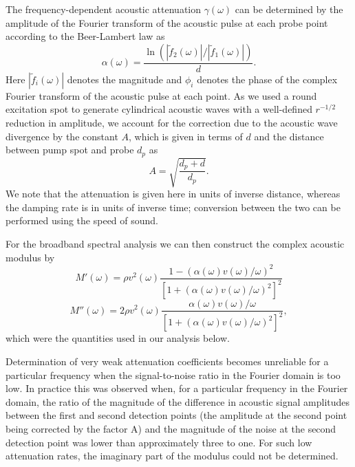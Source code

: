 \documentclass[reprint,showpacs,amsmath,amssymb,aip,jcp]{revtex4-1}
\begin{document}
The frequency-dependent acoustic attenuation $\gamma(\omega)$ can be
determined by the amplitude of the Fourier transform of the acoustic
pulse at each probe point according to the Beer-Lambert law as
\begin{equation}
  \alpha(\omega)=\frac{\ln
    (|\tilde{f}_2(\omega)|/|\tilde{f}_1(\omega)|)}{d}.
\end{equation}
Here $|\tilde{f}_i(\omega)|$ denotes the magnitude and $\phi_i$
denotes the phase of the complex Fourier transform of the acoustic
pulse at each point. As we used a round excitation spot to generate
cylindrical acoustic waves with a well-defined $r^{-1/2}$ reduction in
amplitude, we account for the correction due to the acoustic wave
divergence by the constant $A$, which is given in terms of $d$ and the
distance between pump spot and probe $d_p$ as
\begin{equation}
  A=\sqrt{\frac{d_p+d}{d_p}}.
\end{equation}
We note that the attenuation is given here in units of inverse
distance, whereas the damping rate is in units of inverse time;
conversion between the two can be performed using the speed of sound.

For the broadband spectral analysis we can then construct the complex
acoustic modulus by
\begin{equation}
  M'(\omega) = \rho v^2(\omega) \frac{1 - \left( \alpha(\omega)
      v(\omega) / \omega \right)^2}{\left[1 + \left(\alpha(\omega)
        v(\omega) / \omega\right)^2 \right]^2}
\end{equation}
\begin{equation}
  M''(\omega)=2\rho v^2(\omega) \frac{\alpha(\omega) v(\omega) /
    \omega}{ \left[ 1 + \left( \alpha(\omega) v(\omega) / \omega
      \right)^2\right]^2},
\end{equation}
which were the quantities used in our analysis below.

Determination of very weak attenuation coefficients becomes unreliable
for a particular frequency when the signal-to-noise ratio in the
Fourier domain is too low.  In practice this was observed when, for a
particular frequency in the Fourier domain, the ratio of the magnitude
of the difference in acoustic signal amplitudes between the first and
second detection points (the amplitude at the second point being
corrected by the factor A) and the magnitude of the noise at the
second detection point was lower than approximately three to one.  For
such low attenuation rates, the imaginary part of the modulus could
not be determined.
\end{document}
